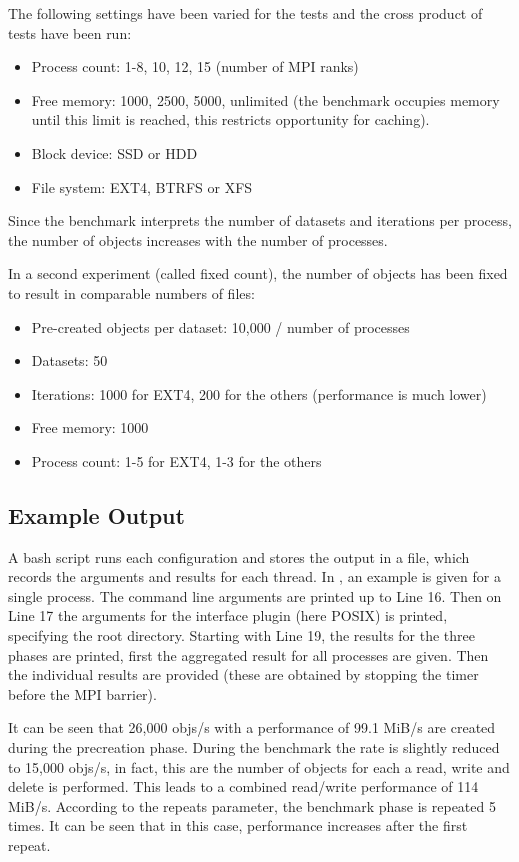\documentclass[a4paper,10pt]{article}
\begin{document}
The following settings have been varied for the tests and the cross product of tests have been run:
\begin{itemize}
\item Process count: 1-8, 10, 12, 15 (number of MPI ranks)
\item Free memory: 1000, 2500, 5000, unlimited (the benchmark occupies memory until this limit is reached, this restricts opportunity for caching). 
\item Block device: SSD or HDD
\item File system: EXT4, BTRFS or XFS
\end{itemize}
Since the benchmark interprets the number of datasets and iterations per process, the number of objects increases with the number of processes.

\medskip

In a second experiment (called fixed count), the number of objects has been fixed to result in comparable numbers of files:
\begin{itemize}
\item Pre-created objects per dataset: 10,000 / number of processes
\item Datasets: 50
\item Iterations: 1000 for EXT4, 200 for the others (performance is much lower)
\item Free memory: 1000
\item Process count: 1-5 for EXT4, 1-3 for the others
\end{itemize}



\subsection{Example Output}
A bash script runs each configuration and stores the output in a file, which records the arguments and results for each thread.
In , an example is given for a single process.
The command line arguments are printed up to Line 16. Then on Line 17 the arguments for the interface plugin (here POSIX) is printed, specifying the root directory.
Starting with Line 19, the results for the three phases are printed, first the aggregated result for all processes are given.
Then the individual results are provided (these are obtained by stopping the timer before the MPI barrier).

It can be seen that 26,000 objs/s with a performance of 99.1 MiB/s are created during the precreation phase.
During the benchmark the rate is slightly reduced to 15,000 objs/s, in fact, this are the number of objects for each a read, write and delete is performed. 
This leads to a combined read/write performance of 114 MiB/s.
According to the repeats parameter, the benchmark phase is repeated 5 times.
It can be seen that in this case, performance increases after the first repeat.
\end{document}
